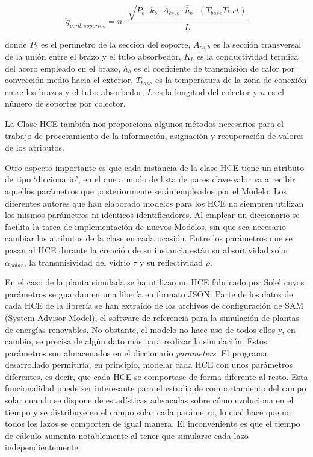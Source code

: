 \documentclass[11pt]{article}
\begin{document}
\begin{equation}
   \dot q_{perd,soportes} =  n \cdot \frac{\sqrt{P_b \cdot k_b \cdot A_{cs,b} \cdot \bar h_b} \cdot (T_{base}T{ext})}{L}
    \label{eq:qperdidassoportes}
\end{equation}

donde \(P_b\) es el perímetro de la sección del soporte, \(A_{cs,b}\) es
la sección transversal de la unión entre el brazo y el tubo absorbedor,
\(K_b\) es la conductividad térmica del acero empleado en el brazo,
\(\bar h_b\) es el coeficiente de transmisión de calor por convección
medio hacia el exterior, \(T_{base}\) es la temperatura de la zona de
conexión entre los brazos y el tubo absorbedor, \(L\) es la longitud del
colector y \(n\) es el número de soportes por colector.

La Clase HCE también nos proporciona algunos métodos necesarios para el
trabajo de procesamiento de la información, asignación y recuperación de
valores de los atributos.

Otro aspecto importante es que cada instancia de la clase HCE tiene un
atributo de tipo `diccionario', en el que a modo de lista de pares
clave-valor va a recibir aquellos parámetros que posteriormente serán
empleados por el Modelo. Los diferentes autores que han elaborado
modelos para los HCE no siempren utilizan los mismos parámetros ni
idénticos identificadores. Al emplear un diccionario se facilita la
tarea de implementación de nuevos Modelos, sin que sea necesario cambiar
los atributos de la clase en cada ocasión. Entre los parámetros que se
pasan al HCE durante la creación de su instancia están su absortividad
solar \(\alpha_{solar}\), la transmisividad del vidrio \(\tau\) y su
reflectividad \(\rho\).

En el caso de la planta simulada se ha utilizao un HCE fabricado por
Solel cuyos parámetros se guardan en una libería en formato JSON. Parte
de los datos de cada HCE de la librería se han extraído de los archivos
de configuración de SAM (System Advisor Model), el software de
referencia para la simulación de plantas de energías renovables. No
obstante, el modelo no hace uso de todos ellos y, en cambio, se precisa
de algún dato más para realizar la simulación. Estos parámetros son
almacenados en el diccionario \emph{parameters}. El programa
desarrollado permitiría, en principio, modelar cada HCE con unos
parámetros diferentes, es decir, que cada HCE se comportase de forma
diferente al resto. Esta funcionalidad puede ser interesante para el
estudio de comportamiento del campo solar cuando se dispone de
estadísticas adecuadas sobre cómo evoluciona en el tiempo y se
distribuye en el campo solar cada parámetro, lo cual hace que no todos
los lazos se comporten de igual manera. El inconveniente es que el
tiempo de cálculo aumenta notablemente al tener que simularse cada lazo
independientemente.
\end{document}
